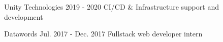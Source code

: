 \begin{cventries}
  \cventry
    {Unity Technologies} %
    {2019 - 2020} %
    {
        CI/CD \& Infrastructure support and development
    }
    

  \cventry
    {Datawords} %
    {Jul. 2017 - Dec. 2017} %
    {Fullstack web developer intern} %


\end{cventries}
